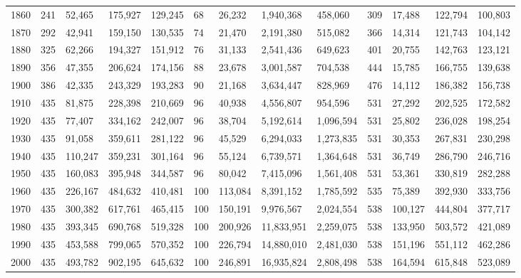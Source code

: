 \begin{landscape}
\begin{table}[!htbp]
\begin{tabular}{p{1.5cm}|p{1cm}p{1.75cm}p{1.75cm}p{1.75cm}|p{1cm}p{1.75cm}p{1.75cm}p{1.75cm}|p{1cm}p{1.75cm}p{1.75cm}p{1.75cm}}
\multicolumn{1}{c}{1860} & 241 & 52,465 & 175,927 & 129,245 & 68 & 26,232 & 1,940,368 & 458,060 & 309 & 17,488 & 122,794 & 100,803 \\ 
\multicolumn{1}{c}{1870} & 292 & 42,941 & 159,150 & 130,535 & 74 & 21,470 & 2,191,380 & 515,082 & 366 & 14,314 & 121,743 & 104,142 \\ 
\multicolumn{1}{c}{1880} & 325 & 62,266 & 194,327 & 151,912 & 76 & 31,133 & 2,541,436 & 649,623 & 401 & 20,755 & 142,763 & 123,121 \\ 
\multicolumn{1}{c}{1890} & 356 & 47,355 & 206,624 & 174,156 & 88 & 23,678 & 3,001,587 & 704,538 & 444 & 15,785 & 166,755 & 139,638 \\ 
\multicolumn{1}{c}{1900} & 386 & 42,335 & 243,329 & 193,283 & 90 & 21,168 & 3,634,447 & 828,969 & 476 & 14,112 & 186,382 & 156,738 \\ 
\multicolumn{1}{c}{1910} & 435 & 81,875 & 228,398 & 210,669 & 96 & 40,938 & 4,556,807 & 954,596 & 531 & 27,292 & 202,525 & 172,582 \\ 
\multicolumn{1}{c}{1920} & 435 & 77,407 & 334,162 & 242,007 & 96 & 38,704 & 5,192,614 & 1,096,594 & 531 & 25,802 & 236,028 & 198,254 \\ 
\multicolumn{1}{c}{1930} & 435 & 91,058 & 359,611 & 281,122 & 96 & 45,529 & 6,294,033 & 1,273,835 & 531 & 30,353 & 267,831 & 230,298 \\ 
\multicolumn{1}{c}{1940} & 435 & 110,247 & 359,231 & 301,164 & 96 & 55,124 & 6,739,571 & 1,364,648 & 531 & 36,749 & 286,790 & 246,716 \\ 
\multicolumn{1}{c}{1950} & 435 & 160,083 & 395,948 & 344,587 & 96 & 80,042 & 7,415,096 & 1,561,408 & 531 & 53,361 & 330,819 & 282,288 \\ 
\multicolumn{1}{c}{1960} & 435 & 226,167 & 484,632 & 410,481 & 100 & 113,084 & 8,391,152 & 1,785,592 & 535 & 75,389 & 392,930 & 333,756 \\ 
\multicolumn{1}{c}{1970} & 435 & 300,382 & 617,761 & 465,415 & 100 & 150,191 & 9,976,567 & 2,024,554 & 538 & 100,127 & 444,804 & 377,717 \\ 
\multicolumn{1}{c}{1980} & 435 & 393,345 & 690,768 & 519,328 & 100 & 200,926 & 11,833,951 & 2,259,075 & 538 & 133,950 & 503,572 & 421,089 \\ 
\multicolumn{1}{c}{1990} & 435 & 453,588 & 799,065 & 570,352 & 100 & 226,794 & 14,880,010 & 2,481,030 & 538 & 151,196 & 551,112 & 462,286 \\ 
\multicolumn{1}{c}{2000} & 435 & 493,782 & 902,195 & 645,632 & 100 & 246,891 & 16,935,824 & 2,808,498 & 538 & 164,594 & 615,848 & 523,089 \\ 

\end{tabular}
\end{table}
\end{landscape}
